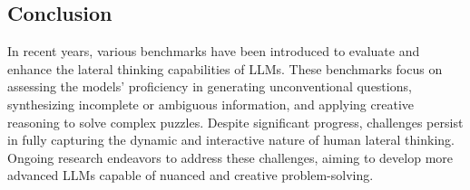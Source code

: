 \subsection{Conclusion}

In recent years, various benchmarks have been introduced to evaluate and enhance the lateral thinking capabilities of \acp{LLM}. These benchmarks focus on assessing the models' proficiency in generating unconventional questions, synthesizing incomplete or ambiguous information, and applying creative reasoning to solve complex puzzles. Despite significant progress, challenges persist in fully capturing the dynamic and interactive nature of human lateral thinking. Ongoing research endeavors to address these challenges, aiming to develop more advanced \acp{LLM} capable of nuanced and creative problem-solving.
